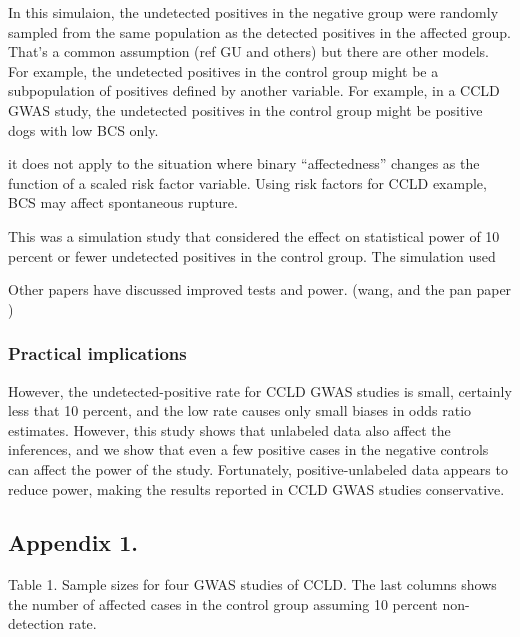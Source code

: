 \documentclass[
]{article}
\begin{document}
In this simulaion, the undetected positives in the negative group were
randomly sampled from the same population as the detected positives in
the affected group. That's a common assumption (ref GU and others) but
there are other models. For example, the undetected positives in the
control group might be a subpopulation of positives defined by another
variable. For example, in a CCLD GWAS study, the undetected positives in
the control group might be positive dogs with low BCS only.

it does not apply to the situation where binary ``affectedness'' changes
as the function of a scaled risk factor variable. Using risk factors for
CCLD example, BCS may affect spontaneous rupture.

This was a simulation study that considered the effect on statistical
power of 10 percent or fewer undetected positives in the control group.
The simulation used

Other papers have discussed improved tests and power. (wang, and the pan
paper )

\newpage

\hypertarget{practical-implications}{%
\subsubsection{Practical implications}\label{practical-implications}}

However, the undetected-positive rate for CCLD GWAS studies is small,
certainly less that 10 percent, and the low rate causes only small
biases in odds ratio estimates. However, this study shows that unlabeled
data also affect the inferences, and we show that even a few positive
cases in the negative controls can affect the power of the study.
Fortunately, positive-unlabeled data appears to reduce power, making the
results reported in CCLD GWAS studies conservative.




\hypertarget{appendix-1.}{%
\subsection{Appendix 1.}\label{appendix-1.}}

Table 1. Sample sizes for four GWAS studies of CCLD. The last columns
shows the number of affected cases in the control group assuming 10
percent non-detection rate.
\end{document}
